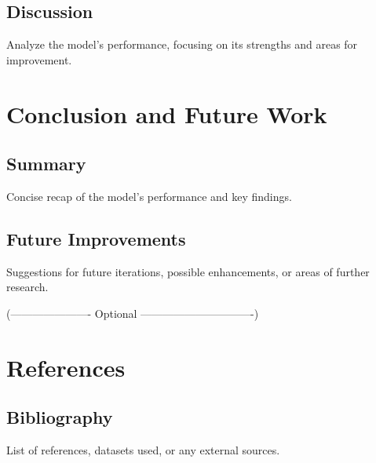 \documentclass[review,onefignum,onetabnum,twoside]{siamart220329}
\begin{document}
\subsection{Discussion}
Analyze the model’s performance, focusing on its strengths and areas for improvement.

\section{Conclusion and Future Work}
\subsection{Summary}
Concise recap of the model's performance and key findings.
\subsection{Future Improvements}
Suggestions for future iterations, possible enhancements, or areas of further research.

(---------------------- Optional -------------------------------)
\section{References}
\subsection{Bibliography}
List of references, datasets used, or any external sources.
\end{document}
